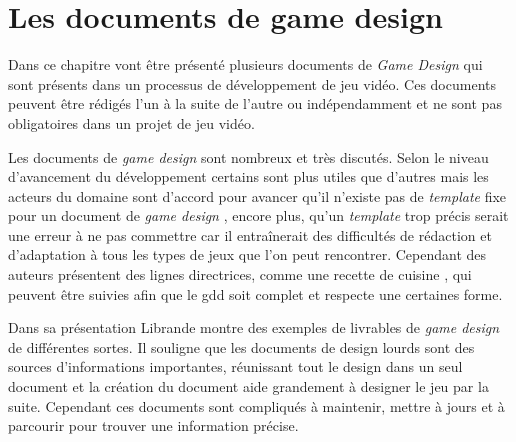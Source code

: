 \chapter{Les documents de game design}

Dans ce chapitre vont être présenté plusieurs documents de \emph{Game Design} qui sont présents dans un processus de développement de jeu vidéo. Ces documents peuvent être rédigés l'un à la suite de l'autre ou indépendamment et ne sont pas obligatoires dans un projet de jeu vidéo.

Les documents de \emph{game design} sont nombreux et très discutés. Selon le niveau d'avancement du développement certains sont plus utiles que d'autres mais les acteurs du domaine sont d'accord pour avancer qu'il n'existe pas de \emph{template} fixe pour un document de \emph{game design} \cite{GD_theory_rouse}, encore plus, qu'un \emph{template} trop précis serait une erreur à ne pas commettre car il entraînerait des difficultés de rédaction et d'adaptation à tous les types de jeux que l'on peut rencontrer. Cependant des auteurs présentent des lignes directrices, comme une recette de cuisine \cite{LevelUpRogers2014}, qui peuvent être suivies afin que le \gls{gdd} soit complet et respecte une certaines forme. 

Dans sa présentation Librande \cite{onepage_librande} montre des exemples de livrables de \emph{game design} de différentes sortes. Il souligne que les documents de design lourds sont des sources d'informations importantes, réunissant tout le design dans un seul document et la création du document aide grandement à designer le jeu par la suite. Cependant ces documents sont compliqués à maintenir, mettre à jours et à parcourir pour trouver une information précise.

